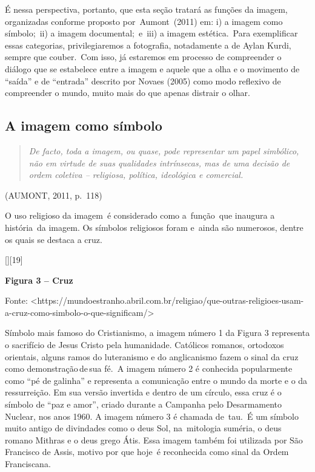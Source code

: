 \documentclass[
  letterpaper,
]{abntex2}
\begin{document}
É nessa perspectiva, portanto, que esta seção tratará as funções da
imagem, organizadas conforme proposto por~Aumont~(2011) em: i) a imagem
como símbolo;~ii) a imagem documental;~e~iii) a imagem estética.~Para
exemplificar essas categorias, privilegiaremos a fotografia, notadamente
a de Aylan Kurdi, sempre que couber.~Com isso, já estaremos em processo
de compreender o diálogo que se estabelece entre a imagem e aquele que a
olha e o movimento de ``saída'' e de ``entrada'' descrito por Novaes
(2005) como modo reflexivo de compreender o mundo, muito mais do que
apenas distrair o olhar.

\hypertarget{a-imagem-como-suxedmbolo}{%
\subsection{A imagem como símbolo~}\label{a-imagem-como-suxedmbolo}}

\begin{quote}
\emph{De facto, toda a imagem, ou quase, pode representar um papel
simbólico, não em virtude de suas qualidades intrínsecas, mas de uma
decisão de ordem coletiva -- religiosa, política, ideológica e
comercial.}~
\end{quote}

(AUMONT, 2011, p.~118)~

O uso religioso da imagem~é considerado como a~função~que inaugura a
história~da imagem. Os símbolos religiosos foram e~ainda são numerosos,
dentre os quais se destaca a cruz.~

{[}{]}{[}19{]} ~

\protect\hypertarget{_Ref503516204}{}{}\textbf{Figura 3 -- Cruz}

Fonte:
\textless https://mundoestranho.abril.com.br/religiao/que-outras-religioes-usam-a-cruz-como-simbolo-o-que-significam/\textgreater~
~

Símbolo mais famoso do Cristianismo, a imagem número 1 da Figura 3
representa o sacrifício de Jesus Cristo pela humanidade. Católicos
romanos, ortodoxos orientais, alguns ramos do luteranismo e do
anglicanismo fazem o sinal da cruz como demonstração\,de\,sua fé.~A
imagem número 2 é conhecida popularmente como ``pé de galinha'' e
representa a comunicação entre o mundo da morte e o da ressurreição. Em
sua versão invertida e dentro de um círculo, essa cruz é o símbolo de
``paz e amor'', criado durante a Campanha pelo Desarmamento Nuclear, nos
anos 1960. A imagem número 3 é chamada de~tau.~É um símbolo muito antigo
de divindades como o deus Sol, na~mitologia suméria, o deus romano
Mithras e o deus grego Átis. Essa imagem também foi utilizada por São
Francisco de Assis, motivo por que hoje~é reconhecida como sinal da
Ordem Franciscana.~
\end{document}
